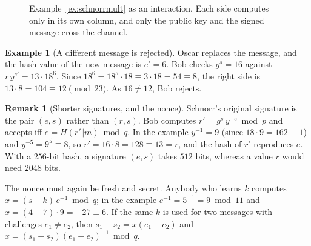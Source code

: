 \documentclass[11pt,a4paper]{article}
\theoremstyle{definition}
\newtheorem{example}[definition]{Example}
\newtheorem{remark}[definition]{Remark}
\newcommand{\Hash}{H}
\begin{document}
\begin{figure}[h]
\centering
{}
\caption{Example~\ref{ex:schnorrmult} as an interaction. Each side computes only in its own column, and only the public key and the signed message cross the channel.}
\end{figure}


\begin{example}[A different message is rejected]
Oscar replaces the message, and the hash value of the new message is $e'=6$. Bob checks $g^s=16$ against $r\,y^{e'}=13\cdot 18^6$. Since $18^6=18^5\cdot 18\equiv 3\cdot 18=54\equiv 8$, the right side is $13\cdot 8=104\equiv 12\pmod{23}$. As $16\ne 12$, Bob rejects.
\end{example}

\begin{remark}[Shorter signatures, and the nonce]
Schnorr's original signature is the pair $(e,s)$ rather than $(r,s)$. Bob computes $r'=g^s\,y^{-e} \bmod p$ and accepts iff $e=\Hash(r'\Vert m) \bmod q$. In the example $y^{-1}=9$ (since $18\cdot 9=162\equiv 1$) and $y^{-5}=9^5\equiv 8$, so $r'=16\cdot 8=128\equiv 13=r$, and the hash of $r'$ reproduces $e$. With a $256$-bit hash, a signature $(e,s)$ takes $512$ bits, whereas a value $r$ would need $2048$ bits.

The nonce must again be fresh and secret. Anybody who learns $k$ computes $x=(s-k)\,e^{-1} \bmod q$; in the example $e^{-1}=5^{-1}=9 \bmod 11$ and $x=(4-7)\cdot 9=-27\equiv 6$. If the same $k$ is used for two messages with challenges $e_1\ne e_2$, then $s_1-s_2=x(e_1-e_2)$ and $x=(s_1-s_2)(e_1-e_2)^{-1} \bmod q$.
\end{remark}
\end{document}
